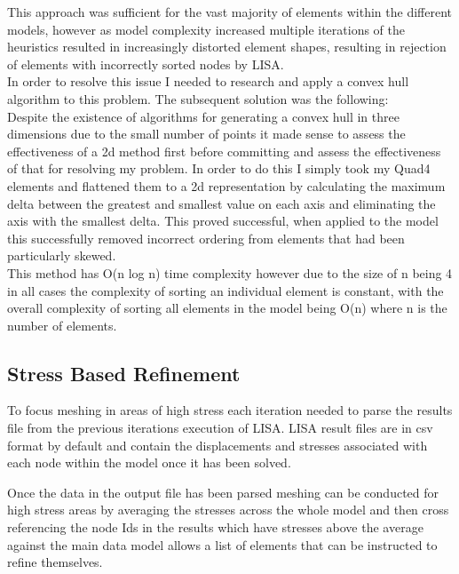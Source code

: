 \noindent
This approach was sufficient for the vast majority of elements within the different models, however as model complexity increased multiple iterations of the heuristics resulted in increasingly distorted element shapes, resulting in rejection of elements with incorrectly sorted nodes by LISA. \\
 
\noindent
In order to resolve this issue I needed to research and apply a convex hull algorithm to this problem. The subsequent solution was the following: \\ 


\noindent
Despite the existence of algorithms for generating a convex hull in three dimensions due to the small number of points it made sense to assess the effectiveness of a 2d method first before committing and assess the effectiveness of that for resolving my problem. In order to do this I simply took my Quad4 elements and flattened them to a 2d representation by calculating the maximum delta between the greatest and smallest value on each axis and eliminating the axis with the smallest delta. This proved successful, when applied to the model this successfully removed incorrect ordering from elements that had been particularly skewed. \\ 
	

\noindent
This method has O(n log n) time complexity however due to the size of n being 4 in all cases the complexity of sorting an individual element is constant, with the overall complexity of sorting all elements in the model being O(n) where n is the number of elements.


\subsection{Stress Based Refinement}
To focus meshing in areas of high stress each iteration needed to parse the results file from the previous iterations execution of LISA. LISA result files are in csv format by default and contain the displacements and stresses associated with each node within the model once it has been solved.

Once the data in the output file has been parsed meshing can be conducted for high stress areas by averaging the stresses across the whole model and then cross referencing the node Ids in the results which have stresses above the average against the main data model allows a list of elements that can be instructed to refine themselves.


